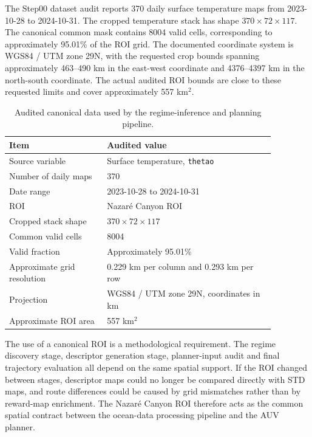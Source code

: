The Step00 dataset audit reports 370 daily surface temperature maps from 2023-10-28 to 2024-10-31. The cropped temperature stack has shape $370 \times 72 \times 117$. The canonical common mask contains 8004 valid cells, corresponding to approximately 95.01\% of the ROI grid. The documented coordinate system is WGS84 / UTM zone 29N, with the requested crop bounds spanning approximately 463--490 km in the east-west coordinate and 4376--4397 km in the north-south coordinate. The actual audited ROI bounds are close to these requested limits and cover approximately 557 km$^2$.

\begin{table}[htbp]
    \centering
    \small
    \caption{Audited canonical data used by the regime-inference and planning pipeline.}
    \label{tab:canonical_dataset}
    \begin{tabular}{p{0.32\linewidth}p{0.55\linewidth}}
        \hline
        Item & Audited value \\
        \hline
        Source variable & Surface temperature, \texttt{thetao} \\
        Number of daily maps & 370 \\
        Date range & 2023-10-28 to 2024-10-31 \\
        ROI & Nazar\'e Canyon ROI \\
        Cropped stack shape & $370 \times 72 \times 117$ \\
        Common valid cells & 8004 \\
        Valid fraction & Approximately 95.01\% \\
        Approximate grid resolution & 0.229 km per column and 0.293 km per row \\
        Projection & WGS84 / UTM zone 29N, coordinates in km \\
        Approximate ROI area & 557 km$^2$ \\
        \hline
    \end{tabular}
\end{table}

The use of a canonical ROI is a methodological requirement. The regime discovery stage, descriptor generation stage, planner-input audit and final trajectory evaluation all depend on the same spatial support. If the ROI changed between stages, descriptor maps could no longer be compared directly with STD maps, and route differences could be caused by grid mismatches rather than by reward-map enrichment. The Nazar\'e Canyon ROI therefore acts as the common spatial contract between the ocean-data processing pipeline and the AUV planner.

